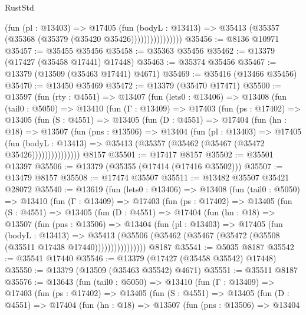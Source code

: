 \begin{lexlean}{RustStd}
\begin{coremodule}
                        (fun (pl : @13403) =>
                        @17405
                          (fun (bodyL : @13413) =>
                          @35413 (@35357 (@35368 (@35379 (@35420 @35426))))))))))))))))
@35456 := @8136 @10971
@35457 := @35455 @35456
@35458 := @35363 @35456
@35462 := @13379 (@17427 (@35458 @17441) @17448)
@35463 := @35374 @35456
@35467 := @13379 (@13509 (@35463 @17441) @4671)
@35469 := @35416 (@13466 @35456)
@35470 := @13450 @35469
@35472 := @13379 (@35470 @17471)
@35500 := @13597
    (fun (rty : @4551) =>
    @13407
      (fun (lets0 : @13406) =>
      @13408
        (fun (tail0 : @5050) =>
        @13410
          (fun (Γ : @13409) =>
          @17403
            (fun (ps : @17402) =>
            @13405
              (fun (S : @4551) =>
              @13405
                (fun (D : @4551) =>
                @17404
                  (fun (hn : @18) =>
                  @13507
                    (fun (pns : @13506) =>
                    @13404
                      (fun (pl : @13403) =>
                      @17405
                        (fun (bodyL : @13413) =>
                        @35413 (@35357 (@35462 (@35467 (@35472 @35426)))))))))))))))
    @8157
@35501 := @17417 @8157
@35502 := @35501 @13397
@35506 := @13379 (@35355 (@17414 (@17416 @35502)))
@35507 := @13479 @8157
@35508 := @17474 @35507
@35511 := @13482 @35507 @35421 @28072
@35540 := @13619
    (fun (lets0 : @13406) =>
    @13408
      (fun (tail0 : @5050) =>
      @13410
        (fun (Γ : @13409) =>
        @17403
          (fun (ps : @17402) =>
          @13405
            (fun (S : @4551) =>
            @13405
              (fun (D : @4551) =>
              @17404
                (fun (hn : @18) =>
                @13507
                  (fun (pns : @13506) =>
                  @13404
                    (fun (pl : @13403) =>
                    @17405
                      (fun (bodyL : @13413) =>
                      @35413
                        (@35506
                          (@35462 (@35467 (@35472 (@35508 (@35511 @17438 @17440))))))))))))))))
    @8187
@35541 := @5035 @8187
@35542 := @35541 @17440
@35546 := @13379 (@17427 (@35458 @35542) @17448)
@35550 := @13379 (@13509 (@35463 @35542) @4671)
@35551 := @35511 @8187
@35576 := @13643
    (fun (tail0 : @5050) =>
    @13410
      (fun (Γ : @13409) =>
      @17403
        (fun (ps : @17402) =>
        @13405
          (fun (S : @4551) =>
          @13405
            (fun (D : @4551) =>
            @17404
              (fun (hn : @18) =>
              @13507
                (fun (pns : @13506) =>
                @13404

\end{coremodule}
\end{lexlean}
